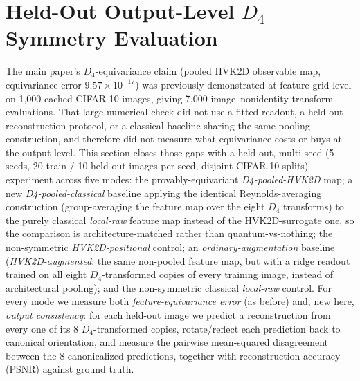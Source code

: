 \documentclass[11pt]{article}
\begin{document}
\section{Held-Out Output-Level \texorpdfstring{$D_4$}{D4} Symmetry Evaluation}
\label{sec:d4_symmetry_experiment}
The main paper's $D_4$-equivariance claim (pooled HVK2D observable map, equivariance error $9.57\times10^{-17}$) was previously demonstrated at feature-grid level on 1,000 cached CIFAR-10 images, giving 7,000 image--nonidentity-transform evaluations. That large numerical check did not use a fitted readout, a held-out reconstruction protocol, or a classical baseline sharing the same pooling construction, and therefore did not measure what equivariance costs or buys at the output level. This section closes those gaps with a held-out, multi-seed (5 seeds, 20 train / 10 held-out images per seed, disjoint CIFAR-10 splits) experiment across five modes: the provably-equivariant \emph{D4-pooled-HVK2D} map; a new \emph{D4-pooled-classical} baseline applying the identical Reynolds-averaging construction (group-averaging the feature map over the eight $D_4$ transforms) to the purely classical \emph{local-raw} feature map instead of the HVK2D-surrogate one, so the comparison is architecture-matched rather than quantum-vs-nothing; the non-symmetric \emph{HVK2D-positional} control; an \emph{ordinary-augmentation} baseline (\emph{HVK2D-augmented}: the same non-pooled feature map, but with a ridge readout trained on all eight $D_4$-transformed copies of every training image, instead of architectural pooling); and the non-symmetric classical \emph{local-raw} control. For every mode we measure both \emph{feature-equivariance error} (as before) and, new here, \emph{output consistency}: for each held-out image we predict a reconstruction from every one of its 8 $D_4$-transformed copies, rotate/reflect each prediction back to canonical orientation, and measure the pairwise mean-squared disagreement between the 8 canonicalized predictions, together with reconstruction accuracy (PSNR) against ground truth.
\end{document}

